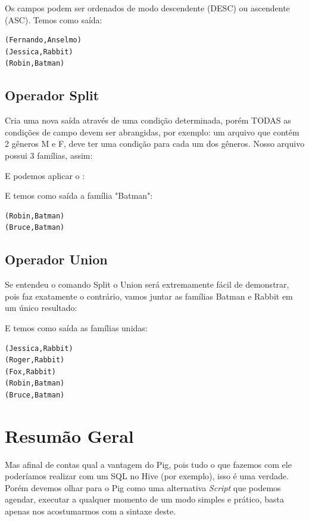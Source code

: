 \documentclass[a4paper,11pt]{article}
\begin{document}
Os campos podem ser ordenados de modo descendente (DESC) ou ascendente (ASC). Temos como saída:
\begin{lstlisting}[]
(Fernando,Anselmo)
(Jessica,Rabbit)
(Robin,Batman)
\end{lstlisting}

\subsection{Operador Split}
Cria uma nova saída através de uma condição determinada, porém TODAS as condições de campo devem ser abrangidas, por exemplo: um arquivo que contém 2 gêneros M e F, deve ter uma condição para cada um dos gêneros. Nosso arquivo possui 3 famílias, assim:\\

E podemos aplicar o : \\

E temos como saída a família "Batman":
\begin{lstlisting}[]
(Robin,Batman)
(Bruce,Batman)
\end{lstlisting}

\subsection{Operador Union}
Se entendeu o comando Split o Union será extremamente fácil de demonstrar, pois faz exatamente o contrário, vamos juntar as famílias Batman e Rabbit em um único resultado: \\

E temos como saída as famílias unidas:
\begin{lstlisting}[]
(Jessica,Rabbit)
(Roger,Rabbit)
(Fox,Rabbit)
(Robin,Batman)
(Bruce,Batman)
\end{lstlisting}

\section{Resumão Geral}
Mas afinal de contas qual a vantagem do Pig, pois tudo o que fazemos com ele poderíamos realizar com um SQL no Hive (por exemplo), isso é uma verdade. Porém devemos olhar para o Pig como uma alternativa \textit{Script} que podemos agendar, executar a qualquer momento de um modo simples e prático, basta apenas nos acostumarmos com a sintaxe deste. 
\end{document}
